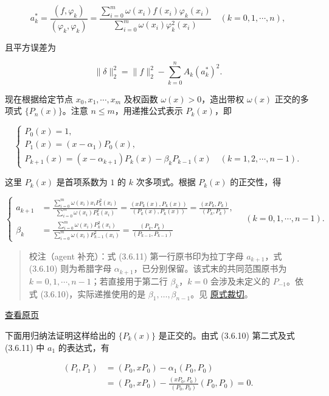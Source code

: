 \documentclass[
  10pt,
  fontset=fandol]{ctexart}
\begin{document}
\[
a_k^*=\frac{(f,\varphi_k)}{(\varphi_k,\varphi_k)}=\frac{\displaystyle\sum_{i=0}^m\omega(x_i)f(x_i)\varphi_k(x_i)}{\displaystyle\sum_{i=0}^m\omega(x_i)\varphi_k^2(x_i)}\quad(k=0,1,\cdots,n),\tag{3.6.9}
\]

且平方误差为

\[
\|\delta\|_2^2=\|f\|_2^2-\sum_{k=0}^n A_k(a_k^*)^2.
\]

现在根据给定节点 \(x_0,x_1,\cdots,x_m\) 及权函数 \(\omega(x)>0\)，造出带权 \(\omega(x)\) 正交的多项式 \(\{P_n(x)\}\)。注意 \(n\leqslant m\)，用递推公式表示 \(P_k(x)\)，即

\[
\begin{cases}
P_0(x)=1,\\
P_1(x)=(x-\alpha_1)P_0(x),\\
P_{k+1}(x)=(x-\alpha_{k+1})P_k(x)-\beta_kP_{k-1}(x)\quad(k=1,2,\cdots,n-1).
\end{cases}\tag{3.6.10}
\]

这里 \(P_k(x)\) 是首项系数为 \(1\) 的 \(k\) 次多项式。根据 \(P_k(x)\) 的正交性，得

\[
\left\{\begin{aligned}
a_{k+1}&=\frac{\displaystyle\sum_{i=0}^m\omega(x_i)x_iP_k^2(x_i)}{\displaystyle\sum_{i=0}^m\omega(x_i)P_k^2(x_i)}=\frac{(xP_k(x),P_k(x))}{(P_k(x),P_k(x))}=\frac{(xP_k,P_k)}{(P_k,P_k)},\\
\beta_k&=\frac{\displaystyle\sum_{i=0}^m\omega(x_i)P_k^2(x_i)}{\displaystyle\sum_{i=0}^m\omega(x_i)P_{k-1}^2(x_i)}=\frac{(P_k,P_k)}{(P_{k-1},P_{k-1})}
\end{aligned}\right.\quad(k=0,1,\cdots,n-1).\tag{3.6.11}
\]

\begin{quote}
校注（agent 补充）：式 (3.6.11) 第一行原书印为拉丁字母 \(a_{k+1}\)，式 (3.6.10) 则为希腊字母 \(\alpha_{k+1}\)，已分别保留。该式末的共同范围原书为 \(k=0,1,\cdots,n-1\)；若直接用于第二行 \(\beta_k\)，\(k=0\) 会涉及未定义的 \(P_{-1}\)。依式 (3.6.10)，实际递推使用的是 \(\beta_1,\ldots,\beta_{n-1}\)。见 \href{../assets/ch03b/p082-recursion-coefficients.png}{原式裁切}。
\end{quote}

\href{../../source-images/pdf-083.jpeg}{查看原页}

下面用归纳法证明这样给出的 \(\{P_k(x)\}\) 是正交的。由式 (3.6.10) 第二式及式 (3.6.11) 中 \(a_1\) 的表达式，有

\[
\begin{aligned}
(P_l,P_1)&=(P_0,xP_0)-\alpha_1(P_0,P_0)\\
&=(P_0,xP_0)-\frac{(xP_0,P_0)}{(P_0,P_0)}(P_0,P_0)=0.
\end{aligned}
\]
\end{document}
